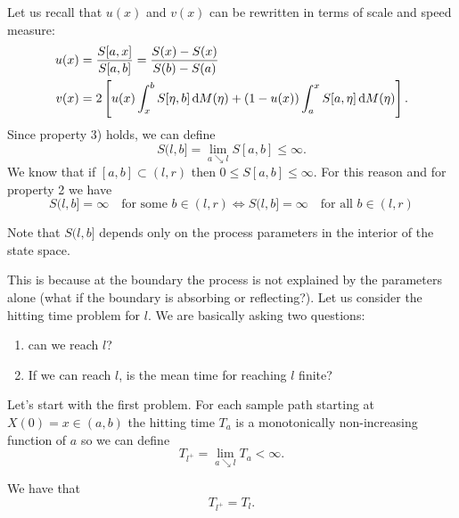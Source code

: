 \documentclass[12pt]{report}
\begin{document}
Let us recall that $u(x)$ and $v(x)$ can be rewritten in terms of scale and speed measure:
\begin{align*}
	u(x)&=\frac{S[a,x]}{S[a,b]}=\frac{S(x)-S(x)}{S(b)-S(a)}\\
	v(x)&=2\left[u(x)\int_{x}^{b}S[\eta,b]\mathop{}\!\mathrm{d} M(\eta)+(1-u(x))\int_{a}^{x}S[a,\eta]\mathop{}\!\mathrm{d} M(\eta)\right].
\end{align*}
Since property 3) holds, we can define
\begin{equation*}
	S(l,b]=\lim_{a\searrow l}S[a,b]\leq\infty.
\end{equation*}
We know that if $[a,b]\subset(l,r)$ then $0\leq S[a,b]\leq\infty$. For this reason and for property 2 we have
\begin{equation*}
	S(l,b]=\infty\quad\text{for some }b\in(l,r)\iff	S(l,b]=\infty\quad\text{for all }b\in(l,r)
\end{equation*}
\begin{remark}
	Note that $S(l,b]$ depends only on the process parameters in the interior of the state space.
\end{remark}
This is because at the boundary the process is not explained by the parameters alone (what if the boundary is absorbing or reflecting?). Let us consider the hitting time problem for $l$. We are basically asking two questions:
\begin{enumerate}
	\item can we reach $l$?
	\item If we can reach $l$, is the mean time for reaching $l$ finite?
\end{enumerate}
Let's start with the first problem. For each sample path starting at $X(0)=x\in(a,b)$ the hitting time $T_{a}$ is a monotonically non-increasing function of $a$ so we can define
\begin{equation*}
	T_{l^{+}}=\lim_{a\searrow l}T_{a}<\infty.
\end{equation*}
\begin{proposition}
	We have that
	\begin{equation*}
		T_{l^{+}}=T_{l}.
	\end{equation*}
\end{proposition}
\end{document}

